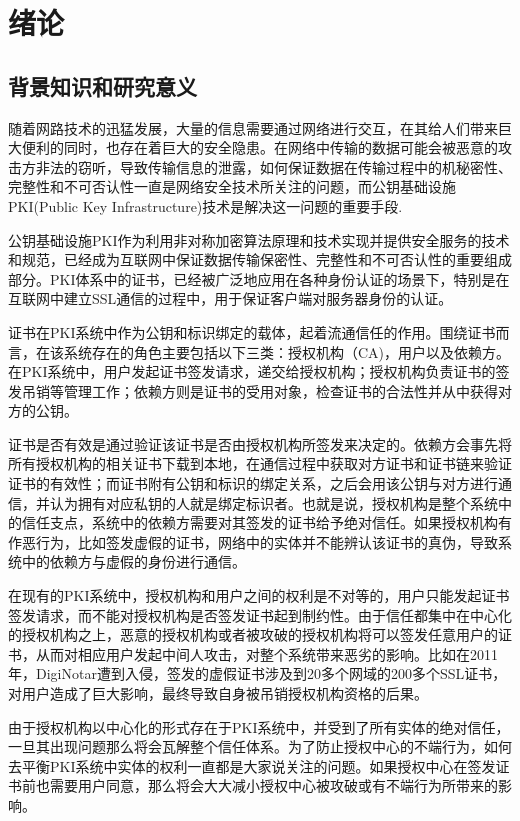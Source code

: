 
\chapter{绪论}

\section{背景知识和研究意义}

随着网路技术的迅猛发展，大量的信息需要通过网络进行交互，在其给人们带来巨大便利的同时，也存在着巨大的安全隐患。在网络中传输的数据可能会被恶意的攻击方非法的窃听，导致传输信息的泄露，如何保证数据在传输过程中的机秘密性、完整性和不可否认性一直是网络安全技术所关注的问题，而公钥基础设施PKI(Public Key Infrastructure)技术是解决这一问题的重要手段.


公钥基础设施PKI作为利用非对称加密算法原理和技术实现并提供安全服务的技术和规范，已经成为互联网中保证数据传输保密性、完整性和不可否认性的重要组成部分。PKI体系中的证书，已经被广泛地应用在各种身份认证的场景下，特别是在互联网中建立SSL通信的过程中，用于保证客户端对服务器身份的认证。


证书在PKI系统中作为公钥和标识绑定的载体，起着流通信任的作用。围绕证书而言，在该系统存在的角色主要包括以下三类：授权机构（CA)，用户以及依赖方。在PKI系统中，用户发起证书签发请求，递交给授权机构；授权机构负责证书的签发吊销等管理工作；依赖方则是证书的受用对象，检查证书的合法性并从中获得对方的公钥。

证书是否有效是通过验证该证书是否由授权机构所签发来决定的。依赖方会事先将所有授权机构的相关证书下载到本地，在通信过程中获取对方证书和证书链来验证证书的有效性；而证书附有公钥和标识的绑定关系，之后会用该公钥与对方进行通信，并认为拥有对应私钥的人就是绑定标识者。也就是说，授权机构是整个系统中的信任支点，系统中的依赖方需要对其签发的证书给予绝对信任。如果授权机构有作恶行为，比如签发虚假的证书，网络中的实体并不能辨认该证书的真伪，导致系统中的依赖方与虚假的身份进行通信。

在现有的PKI系统中，授权机构和用户之间的权利是不对等的，用户只能发起证书签发请求，而不能对授权机构是否签发证书起到制约性。由于信任都集中在中心化的授权机构之上，恶意的授权机构或者被攻破的授权机构将可以签发任意用户的证书，从而对相应用户发起中间人攻击，对整个系统带来恶劣的影响。比如在2011年，DigiNotar遭到入侵，签发的虚假证书涉及到20多个网域的200多个SSL证书\supercite{prins2011diginotar}，对用户造成了巨大影响，最终导致自身被吊销授权机构资格的后果。

由于授权机构以中心化的形式存在于PKI系统中，并受到了所有实体的绝对信任，一旦其出现问题那么将会瓦解整个信任体系。为了防止授权中心的不端行为，如何去平衡PKI系统中实体的权利一直都是大家说关注的问题。如果授权中心在签发证书前也需要用户同意，那么将会大大减小授权中心被攻破或有不端行为所带来的影响。


